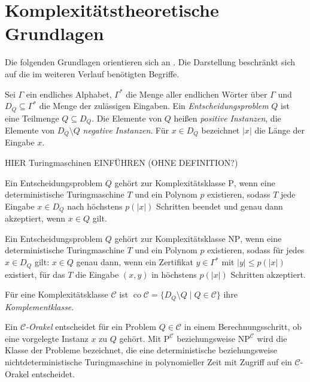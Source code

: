 \section{Komplexitätstheoretische Grundlagen}
\label{sec:complexity}

Die folgenden Grundlagen orientieren sich an
\textcite[Abschnitt~2.2]{dvorak:2012:computational-aspects}. Die Darstellung
beschränkt sich auf die im weiteren Verlauf ben\"otigten Begriffe.

\begin{Definition}[Entscheidungsproblem]
    \label{def:decision-problem}
    Sei \(\Gamma\) ein endliches Alphabet, \(\Gamma^*\) die Menge aller
    endlichen Wörter über \(\Gamma\) und \(D_Q\subseteq\Gamma^*\) die
    Menge der zulässigen Eingaben. Ein \emph{Entscheidungsproblem} \(Q\)
    ist eine Teilmenge \(Q\subseteq D_Q\). Die Elemente von \(Q\) heißen
    \emph{positive Instanzen}, die Elemente von \(D_Q\setminus Q\)
    \emph{negative Instanzen}. Für \(x\in D_Q\) bezeichnet \(|x|\) die
    Länge der Eingabe \(x\).
\end{Definition}
HIER Turingmaschinen EINFÜHREN (OHNE DEFINITION?)
\begin{Definition}[P]
    \label{def:p-np-conp}
    Ein Entscheidungsproblem \(Q\) gehört zur Komplexitätsklasse
    \(\mathrm{P}\), wenn eine deterministische Turingmaschine \(T\) und
    ein Polynom \(p\) existieren, sodass \(T\) jede Eingabe
    \(x\in D_Q\) nach höchstens \(p(|x|)\) Schritten beendet und genau
    dann akzeptiert, wenn \(x\in Q\) gilt.
\end{Definition}

\begin{Definition}[NP]
        Ein Entscheidungsproblem \(Q\) gehört zur Komplexitätsklasse
    \(\mathrm{NP}\), wenn eine deterministische Turingmaschine \(T\) und
    ein Polynom \(p\) existieren, sodass für jedes \(x\in D_Q\) gilt:
    \(x\in Q\) genau dann, wenn ein Zertifikat \(y\in\Gamma^*\) mit
    \(|y|\leq p(|x|)\) existiert, für das \(T\) die Eingabe \((x,y)\)
    in höchstens \(p(|x|)\) Schritten akzeptiert.
\end{Definition}

\begin{Definition}[Komplementklasse]
    Für eine Komplexitätsklasse \(\mathcal{C}\) ist
    \(\operatorname{co}\mathcal{C}
    =\{D_Q\setminus Q\mid Q\in\mathcal{C}\}\) ihre
    \emph{Komplementklasse}.
\end{Definition}

\begin{Definition}[Orakel]
    Ein \emph{\(\mathcal{C}\)-Orakel} entscheidet für ein Problem
    \(Q\in\mathcal{C}\) in einem Berechnungsschritt, ob eine vorgelegte
    Instanz \(x\) zu \(Q\) gehört. Mit
    \(\mathrm{P}^{\mathcal{C}}\) beziehungsweise
    \(\mathrm{NP}^{\mathcal{C}}\) wird die Klasse der Probleme
    bezeichnet, die eine deterministische beziehungsweise
    nichtdeterministische Turingmaschine in polynomieller Zeit mit
    Zugriff auf ein \(\mathcal{C}\)-Orakel entscheidet.

\end{Definition}

